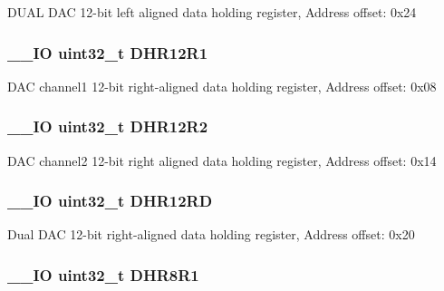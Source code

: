 D\-U\-A\-L D\-A\-C 12-\/bit left aligned data holding register, Address offset\-: 0x24 \hypertarget{struct_d_a_c___type_def_ac2bb55b037b800a25852736afdd7a258}{
\subsubsection[{D\-H\-R12\-R1}]{\setlength{\rightskip}{0pt plus 5cm}\-\_\-\-\_\-\-I\-O uint32\-\_\-t D\-H\-R12\-R1}}\label{struct_d_a_c___type_def_ac2bb55b037b800a25852736afdd7a258}
D\-A\-C channel1 12-\/bit right-\/aligned data holding register, Address offset\-: 0x08 \hypertarget{struct_d_a_c___type_def_a804c7e15dbb587c7ea25511f6a7809f7}{
\subsubsection[{D\-H\-R12\-R2}]{\setlength{\rightskip}{0pt plus 5cm}\-\_\-\-\_\-\-I\-O uint32\-\_\-t D\-H\-R12\-R2}}\label{struct_d_a_c___type_def_a804c7e15dbb587c7ea25511f6a7809f7}
D\-A\-C channel2 12-\/bit right aligned data holding register, Address offset\-: 0x14 \hypertarget{struct_d_a_c___type_def_a1590b77e57f17e75193da259da72095e}{
\subsubsection[{D\-H\-R12\-R\-D}]{\setlength{\rightskip}{0pt plus 5cm}\-\_\-\-\_\-\-I\-O uint32\-\_\-t D\-H\-R12\-R\-D}}\label{struct_d_a_c___type_def_a1590b77e57f17e75193da259da72095e}
Dual D\-A\-C 12-\/bit right-\/aligned data holding register, Address offset\-: 0x20 \hypertarget{struct_d_a_c___type_def_ad0a200e12acad17a5c7d2059159ea7e1}{
\subsubsection[{D\-H\-R8\-R1}]{\setlength{\rightskip}{0pt plus 5cm}\-\_\-\-\_\-\-I\-O uint32\-\_\-t D\-H\-R8\-R1}}\label{struct_d_a_c___type_def_ad0a200e12acad17a5c7d2059159ea7e1}
